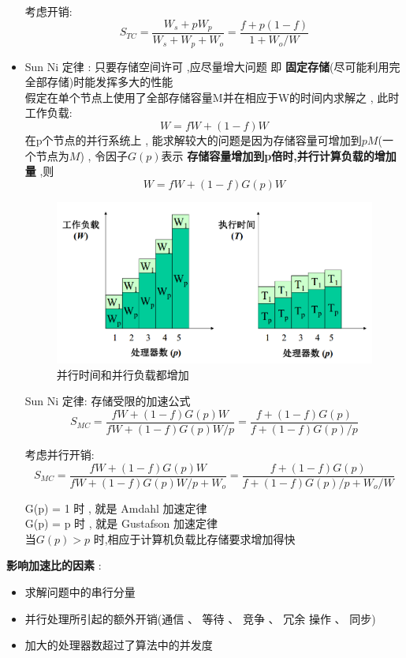 \documentclass[UTF8,a4paper]{ctexart}
\begin{document}
\begin{itemize}
     考虑开销:
     \[S_{TC} =  \frac{W_s + pW_p}{W_s + W_p + W_o} = \frac{f + p(1 - f)}{1 + W_o / W} \]

    \item Sun Ni 定律 : 只要存储空间许可 ,应尽量增大问题 即 \textbf{固定存储}(尽可能利用完全部存储)时能发挥多大的性能\\
    假定在单个节点上使用了全部存储容量M并在相应于W的时间内求解之 , 此时工作负载:
    \[W = fW + (1 - f)W\]
    在p个节点的并行系统上 , 能求解较大的问题是因为存储容量可增加到$pM$(一个节点为$M$) , 令因子$G(p)$表示 \textbf{存储容量增加到p倍时,并行计算负载的增加量} ,则
    \[W = fW + (1 - f)G(p)W\]
    \begin{figure}[H]
      \centering
      \includegraphics[scale = 0.3]{assets/ParallelComputing_8cabd.png}
      \caption{并行时间和并行负载都增加}
    \end{figure}

    Sun Ni 定律: 存储受限的加速公式
    \[S_{MC} = \frac{fW + (1 - f)G(p)W}{fW + (1  -f)G(p)W / p} = \frac{f +(1 - f)G(p)}{f + (1 - f)G(p) / p}\]

    考虑并行开销:
    \[S_{MC} = \frac{fW + (1 - f)G(p)W}{fW + (1  -f)G(p)W / p + W_o} = \frac{f +(1 - f)G(p)}{f + (1 - f)G(p) / p + W_o / W}\]

    G(p) = 1 时 , 就是 Amdahl 加速定律\\
    G(p) = p 时 , 就是 Gustafson 加速定律\\
    当$G(p) > p$ 时,相应于计算机负载比存储要求增加得快

  \end{itemize}

  \textbf{影响加速比的因素} :
  \begin{itemize}
    \item 求解问题中的串行分量
    \item 并行处理所引起的额外开销(通信 、 等待 、 竞争 、 冗余 操作 、 同步)
    \item 加大的处理器数超过了算法中的并发度
  \end{itemize}
\end{document}

